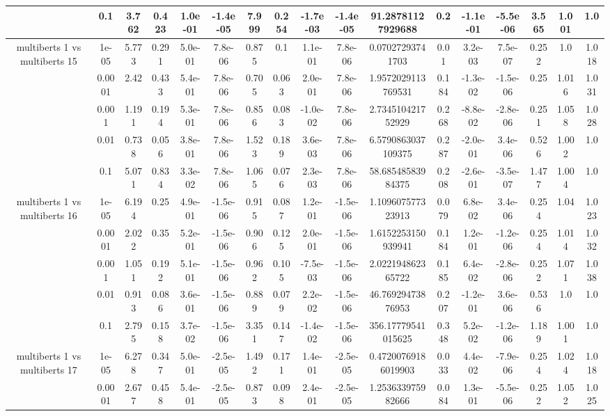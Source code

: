 \begin{tabular}{|c|c|c|c|c|c|c|c|c|c|c|c|c|c|c|c|c|}
 & 0.1 & 3.762 & 0.423 & 1.0e-01 & -1.4e-05 & 7.999 & 0.254 & -1.7e-03 & -1.4e-05 & 91.28781127929688 & 0.2 & -1.1e-01 & -5.5e-06 & 3.565 & 1.001 & 1.0 \\
\hline
\multirow{5}{*}{multiberts 1 vs multiberts 15} & 1e-05 & 5.773 & 0.291 & 5.0e-01 & 7.8e-06 & 0.875 & 0.1 & 1.1e-01 & 7.8e-06 & 0.07027293741703 & 0.01 & 3.2e-03 & 7.5e-07 & 0.252 & 1.0 & 1.018 \\
 & 0.0001 & 2.42 & 0.433 & 5.4e-01 & 7.8e-06 & 0.705 & 0.063 & 2.0e-01 & 7.8e-06 & 1.9572029113769531 & 0.184 & -1.3e-02 & -1.5e-06 & 0.25 & 1.016 & 1.031 \\
 & 0.001 & 1.191 & 0.194 & 5.3e-01 & 7.8e-06 & 0.856 & 0.083 & -1.0e-02 & 7.8e-06 & 2.734510421752929 & 0.268 & -8.8e-02 & -2.8e-06 & 0.251 & 1.058 & 1.028 \\
 & 0.01 & 0.738 & 0.056 & 3.8e-01 & 7.8e-06 & 1.523 & 0.189 & 3.6e-03 & 7.8e-06 & 6.5790863037109375 & 0.287 & -2.0e-01 & 3.4e-06 & 0.526 & 1.002 & 1.0 \\
 & 0.1 & 5.071 & 0.834 & 3.3e-02 & 7.8e-06 & 1.065 & 0.076 & 2.3e-03 & 7.8e-06 & 58.68548583984375 & 0.208 & -2.6e-01 & -3.5e-07 & 1.477 & 1.004 & 1.0 \\
\hline
\multirow{5}{*}{multiberts 1 vs multiberts 16} & 1e-05 & 6.194 & 0.25 & 4.9e-01 & -1.5e-06 & 0.915 & 0.087 & 1.2e-01 & -1.5e-06 & 1.109607577323913 & 0.079 & 6.8e-02 & 3.4e-06 & 0.254 & 1.04 & 1.023 \\
 & 0.0001 & 2.022 & 0.35 & 5.2e-01 & -1.5e-06 & 0.906 & 0.125 & 2.0e-01 & -1.5e-06 & 1.6152253150939941 & 0.184 & 1.2e-01 & -1.2e-06 & 0.254 & 1.014 & 1.032 \\
 & 0.001 & 1.051 & 0.192 & 5.1e-01 & -1.5e-06 & 0.962 & 0.105 & -7.5e-03 & -1.5e-06 & 2.022194862365722 & 0.185 & 6.4e-02 & -2.8e-06 & 0.252 & 1.071 & 1.038 \\
 & 0.01 & 0.913 & 0.086 & 3.6e-01 & -1.5e-06 & 0.889 & 0.079 & 2.2e-02 & -1.5e-06 & 46.76929473876953 & 0.207 & -1.2e-01 & 3.6e-06 & 0.536 & 1.0 & 1.0 \\
 & 0.1 & 2.795 & 0.158 & 3.7e-02 & -1.5e-06 & 3.351 & 0.147 & -1.4e-02 & -1.5e-06 & 356.17779541015625 & 0.348 & 5.2e-02 & -1.2e-06 & 1.189 & 1.001 & 1.0 \\
\hline
\multirow{5}{*}{multiberts 1 vs multiberts 17} & 1e-05 & 6.278 & 0.347 & 5.0e-01 & -2.5e-05 & 1.492 & 0.171 & 1.4e-01 & -2.5e-05 & 0.47200769186019903 & 0.033 & 4.4e-02 & -7.9e-06 & 0.254 & 1.024 & 1.018 \\
 & 0.0001 & 2.677 & 0.458 & 5.4e-01 & -2.5e-05 & 0.873 & 0.098 & 2.4e-01 & -2.5e-05 & 1.253633975982666 & 0.084 & 1.3e-01 & -5.5e-06 & 0.252 & 1.052 & 1.025 \\

\end{tabular}
